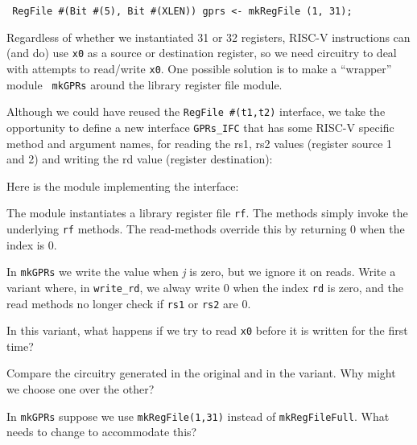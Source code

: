 \begin{tabbing}\footnotesize\tt
\hmm RegFile \#(Bit \#(5), Bit \#(XLEN)) gprs <- mkRegFile (1, 31);
\end{tabbing}

Regardless of whether we instantiated 31 or 32 registers, RISC-V
instructions can (and do) use {\tt x0} as a source or destination
register, so we need circuitry to deal with attempts to read/write
{\tt x0}.  One possible solution is to make a ``wrapper'' module {\tt
mkGPRs} around the library register file module.

Although we could have reused the {\tt RegFile \#(t1,t2)} interface,
we take the opportunity to define a new interface {\tt GPRs\_IFC} that
has some RISC-V specific method and argument names, for reading the
rs1, rs2 values (register source 1 and 2) and writing the rd value
(register destination):




Here is the module implementing the interface:


The module instantiates a library register file {\tt rf}.  The methods
simply invoke the underlying {\tt rf} methods.  The read-methods
override this by returning 0 when the index is 0.

\hdivider

\Exercise
\hm In {\tt mkGPRs} we write the value when \emph{j} is zero, but we
ignore it on reads.  Write a variant where, in {\tt write\_rd}, we
alway write 0 when the index {\tt rd} is zero, and the read methods no
longer check if {\tt rs1} or {\tt rs2} are 0.

In this variant, what happens if we try to read {\tt x0} before it is
written for the first time?

Compare the circuitry generated in the original and in the variant.
Why might we choose one over the other?

\Exercise
\hm In {\tt mkGPRs} suppose we use {\tt mkRegFile(1,31)} instead of
{\tt mkRegFileFull}.  What needs to change to accommodate this?

\Endexercise


